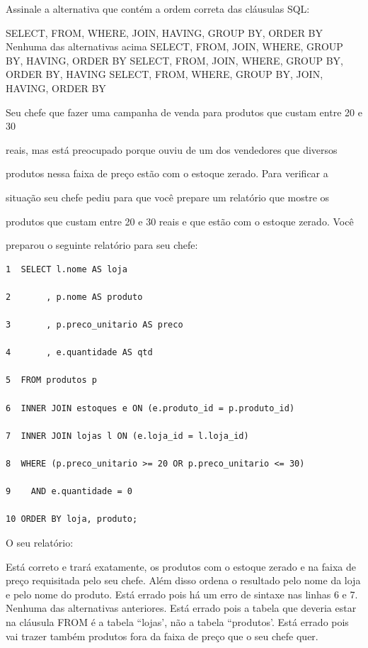 \documentclass[12pt, addpoints]{exam}
\begin{document}
\begin{questions}
\question

Assinale a alternativa que contém a ordem correta das cláusulas SQL:


\begin{choices}
\choice SELECT, FROM, WHERE, JOIN, HAVING, GROUP BY, ORDER BY
\choice Nenhuma das alternativas acima
\choice SELECT, FROM, JOIN, WHERE, GROUP BY, HAVING, ORDER BY
\choice SELECT, FROM, JOIN, WHERE, GROUP BY, ORDER BY, HAVING
\choice SELECT, FROM, WHERE, GROUP BY, JOIN, HAVING, ORDER BY
\end{choices}

\question

Seu chefe que fazer uma campanha de venda para produtos que custam entre 20 e 30

reais, mas está preocupado porque ouviu de um dos vendedores que diversos

produtos nessa faixa de preço estão com o estoque zerado. Para verificar a

situação seu chefe pediu para que você prepare um relatório que mostre os

produtos que custam entre 20 e 30 reais e que estão com o estoque zerado. Você

preparou o seguinte relatório para seu chefe:

\begin{tcolorbox}

 \begin{verbatim}1  SELECT l.nome AS loja

2       , p.nome AS produto

3       , p.preco_unitario AS preco

4       , e.quantidade AS qtd

5  FROM produtos p

6  INNER JOIN estoques e ON (e.produto_id = p.produto_id)

7  INNER JOIN lojas l ON (e.loja_id = l.loja_id)

8  WHERE (p.preco_unitario >= 20 OR p.preco_unitario <= 30)

9    AND e.quantidade = 0

10 ORDER BY loja, produto;

 \end{verbatim}

\end{tcolorbox}

O seu relatório:
\begin{choices}
\choice Está correto e trará exatamente, os produtos com o estoque zerado e na faixa de preço requisitada pelo seu chefe. Além disso ordena o resultado pelo nome da loja e pelo nome do produto.
\choice Está errado pois há um erro de sintaxe nas linhas 6 e 7.
\choice Nenhuma das alternativas anteriores.
\choice Está errado pois a tabela que deveria estar na cláusula FROM é a tabela ``lojas', não a tabela ``produtos'.
\choice Está errado pois vai trazer também produtos fora da faixa de preço que o seu chefe quer.
\end{choices}


\end{questions}
\end{document}
